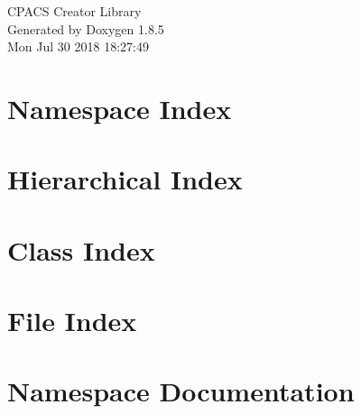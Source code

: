 \documentclass[twoside]{book}
\newcommand{\clearemptydoublepage}{%
  \newpage{\pagestyle{empty}\cleardoublepage}%
}
\begin{document}
\hypersetup{pageanchor=false}
\begin{titlepage}
\vspace*{7cm}
\begin{center}%
{\Large C\-P\-A\-C\-S Creator Library }\\
\vspace*{1cm}
{\large Generated by Doxygen 1.8.5}\\
\vspace*{0.5cm}
{\small Mon Jul 30 2018 18:27:49}\\
\end{center}
\end{titlepage}
\clearemptydoublepage
\tableofcontents
\clearemptydoublepage
{}
\hypersetup{pageanchor=true}

\chapter{Namespace Index}

\chapter{Hierarchical Index}

\chapter{Class Index}

\chapter{File Index}

\chapter{Namespace Documentation}








\end{document}
